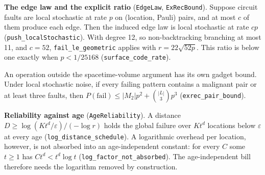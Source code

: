 \documentclass[
]{article}
\begin{document}
\textbf{The edge law and the explicit ratio} (\texttt{EdgeLaw},
\texttt{ExRecBound}). Suppose circuit faults are local stochastic at
rate \(p\) on (location, Pauli) pairs, and at most \(c\) of them produce
each edge. Then the induced edge law is local stochastic at rate \(cp\)
(\texttt{p\allowbreak{}u\allowbreak{}s\allowbreak{}h\allowbreak{}\_\allowbreak{}l\allowbreak{}o\allowbreak{}c\allowbreak{}a\allowbreak{}l\allowbreak{}S\allowbreak{}t\allowbreak{}o\allowbreak{}c\allowbreak{}h\allowbreak{}a\allowbreak{}s\allowbreak{}t\allowbreak{}i\allowbreak{}c}).
With degree 12, so non-backtracking branching at most 11, and \(c=52\),
\texttt{f\allowbreak{}a\allowbreak{}i\allowbreak{}l\allowbreak{}\_\allowbreak{}l\allowbreak{}e\allowbreak{}\_\allowbreak{}g\allowbreak{}e\allowbreak{}o\allowbreak{}m\allowbreak{}e\allowbreak{}t\allowbreak{}r\allowbreak{}i\allowbreak{}c}
applies with \(r=22\sqrt{52p}\). This ratio is below one exactly when
\(p<1/25168\)
(\texttt{s\allowbreak{}u\allowbreak{}r\allowbreak{}f\allowbreak{}a\allowbreak{}c\allowbreak{}e\allowbreak{}\_\allowbreak{}c\allowbreak{}o\allowbreak{}d\allowbreak{}e\allowbreak{}\_\allowbreak{}r\allowbreak{}a\allowbreak{}t\allowbreak{}e}).

An operation outside the spacetime-volume argument has its own gadget
bound. Under local stochastic noise, if every failing pattern contains a
malignant pair or at least three faults, then
\(P(\mathrm{fail})\le|M_2|p^2+\binom{|L|}{3}p^3\)
(\texttt{exrec\_pair\_bound}).

\textbf{Reliability against age} (\texttt{AgeReliability}). A distance
\(D\ge\log(Kt^d/\varepsilon)/(-\log r)\) holds the global failure over
\(Kt^d\) locations below \(\varepsilon\) at every age
(\texttt{l\allowbreak{}o\allowbreak{}g\allowbreak{}\_\allowbreak{}d\allowbreak{}i\allowbreak{}s\allowbreak{}t\allowbreak{}a\allowbreak{}n\allowbreak{}c\allowbreak{}e\allowbreak{}\_\allowbreak{}s\allowbreak{}c\allowbreak{}h\allowbreak{}e\allowbreak{}d\allowbreak{}u\allowbreak{}l\allowbreak{}e}).
A logarithmic overhead per location, however, is not absorbed into an
age-independent constant: for every \(C\) some \(t\ge1\) has
\(Ct^d<t^d\log t\)
(\texttt{l\allowbreak{}o\allowbreak{}g\allowbreak{}\_\allowbreak{}f\allowbreak{}a\allowbreak{}c\allowbreak{}t\allowbreak{}o\allowbreak{}r\allowbreak{}\_\allowbreak{}n\allowbreak{}o\allowbreak{}t\allowbreak{}\_\allowbreak{}a\allowbreak{}b\allowbreak{}s\allowbreak{}o\allowbreak{}r\allowbreak{}b\allowbreak{}e\allowbreak{}d}).
The age-independent bill therefore needs the logarithm removed by
construction.
\end{document}
